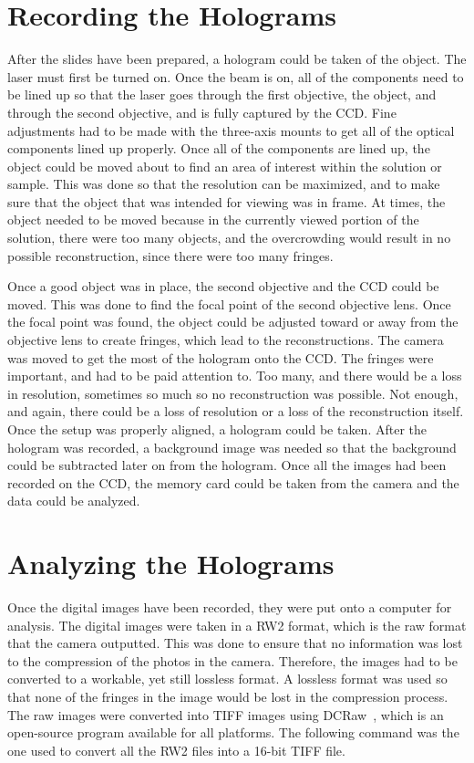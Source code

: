 \section{Recording the Holograms}

After the slides have been prepared, a hologram could be taken of the object. The
laser must first be turned on. Once the beam is on, all of the components need
to be lined up so that the laser goes through the first objective, the object,
and through the second objective, and is fully captured by the CCD\@. Fine
adjustments had to be made with the three-axis mounts to get all of the optical
components lined up properly.
Once all of the
components are lined up, the object could be moved about to find an area of
interest within the solution or sample. This was done so that the resolution can
be maximized, and to make sure that the object that was intended for viewing
was
in frame. At times, the object needed to be moved because in the currently
viewed portion of the solution, there were too many objects, and the
overcrowding would result in no possible reconstruction, since there were too
many fringes.

Once a good object
was in place, the second objective and the CCD could be moved. This was done to
find the focal point of the second objective lens. Once the focal point was found,
the object could be adjusted toward or away from the objective lens to create fringes,
which lead to the reconstructions. The camera was moved to get the most of the
hologram onto the CCD\@. The fringes were important, and had to be paid
attention to. Too many,
and there would be a loss in resolution, sometimes so much so no
reconstruction was possible. Not enough, and again, there could be a loss of
resolution or a loss of the reconstruction itself. Once the setup was properly
aligned, a hologram could be taken. After the hologram was recorded, a
background image was needed so that the background could be subtracted later on
from the hologram. Once all the images had been recorded on the
CCD, the memory card could be taken from the camera and the data could be analyzed.

\section{Analyzing the Holograms}

Once the digital images have been recorded, they were put onto a computer for
analysis. The digital images were taken in a RW2 format, which is the raw
format that the camera outputted. This was done to ensure that
no information was lost to the compression of the photos in the camera.
Therefore, the images had to be converted to a workable, yet still lossless
format. A lossless format was used so that none of the fringes in the image
would be lost in the compression process. 
The raw images were converted into TIFF images using DCRaw~\cite{DCRaw},
which is an
open-source program available for all platforms. The following command was the
one used to convert all the RW2 files into a 16-bit TIFF file.

